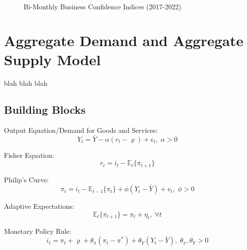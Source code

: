 \documentclass[12pt]{article}
\newcommand{\1}{\mathbbm 1}
\renewcommand{\rho}{\varrho}
\begin{document}
\begin{figure}[H]
	\centering
	\scalebox{0.8}{}
	\caption[]{Bi-Monthly Business Confidence Indices (2017-2022)}
\end{figure}


		
		
		\section{Aggregate Demand and Aggregate Supply Model}
		
		blah blah blah
		
		\subsection{Building Blocks}
		
		Output Equation/Demand for Goods and Services: 
		\begin{equation}
			Y_{t} = \bar{Y} - \alpha (r_{t} - \rho) + \epsilon_{t}, \; \alpha > 0
		\end{equation}
	
	
	Fisher Equation: 
	\begin{equation}
		r_{t} = i_{t} - \mathbb{E}_{t}\{\pi_{t+1}\}
	\end{equation}
		
		Philip's Curve: 
		\begin{equation}
			\pi_{t} = i_{t} - \mathbb{E}_{t-1}\{\pi_{t}\} + \phi(Y_{t} - \bar{Y}) + v_{t}, \; \phi > 0
		\end{equation}
		
		Adaptive Expectations:
		\begin{equation}
			\mathbb{E}_{t}\{\pi_{t+1}\} = \pi_{t} + \eta_{t}, \; \forall t
		\end{equation}
	
	Monetary Policy Rule:
	\begin{equation}
		i_{t} = \pi_{t} + \rho + \theta_{\pi} (\pi_{t} - \pi^{*}) + \theta_{Y} (Y_{t} - \bar{Y}), \; \theta_{\pi}, \theta_{Y} > 0
	\end{equation}


\end{document}
